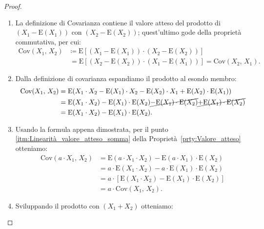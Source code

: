         \begin{proof}
            \hfill
            \begin{enumerate}
                \item La definizione di Covarianza contiene il valore atteso del prodotto di $(X_1-\text{E}(X_1))$ con $(X_2-\text{E}(X_2))$; quest'ultimo gode della proprietà commutativa, per cui:
                    \begin{align*}
                        \text{Cov}(X_1,\,X_2) &\coloneqq 
                        \text{E}\left[(X_1-\text{E}(X_1))\cdot(X_2-\text{E}(X_2))\right] \\
                        &\,= \text{E}\left[(X_2-\text{E}(X_2))\cdot(X_1-\text{E}(X_1))\right] =
                        \text{Cov}(X_2,\,X_1)
                    .\end{align*}
                \item Dalla definizione di covarianza espandiamo il prodotto al esondo membro:
                    \begin{align*}
                        \text{Cov}(X_1,\,X_2) &= \text{E}(X_1\cdot X_2 - \text{E}(X_1)\cdot X_2 -\text{E}(X_2)\cdot X_1 +\text{E}(X_2)\cdot \text{E}(X_1)) \\
                        &= \text{E}(X_1\cdot X_2) - \text{E}(X_1)\cdot \text{E}(X_2) \cancel{-\text{E}(X_1)\cdot \text{E}(X_2)} \cancel{+ \text{E}(X_1)\cdot \text{E}(X_2)} \\
                        &= \text{E}(X_1 \cdot X_2) - \text{E}(X_1)\cdot \text{E}(X_2)
                    .\end{align*}
                \item Usando la formula appena dimostrata, per il punto \eqref{itm:Linearità_valore_atteso_somma} della Proprietà~\ref{prty:Valore_atteso} otteniamo:
                    \begin{align*}
                        \text{Cov}(a\cdot X_1,\,X_2) &= \text{E}(a\cdot X_1 \cdot X_2) - \text{E}(a\cdot X_1)\cdot \text{E}(X_2) \\
                        &= a\cdot\text{E}(X_1 \cdot X_2) - a\cdot \text{E}(X_1) \cdot \text{E}(X_2) \\
                        &= a \cdot \left[\text{E}(X_1 \cdot X_2) - \text{E}(X_1) \cdot \text{E}(X_2)\right] \\
                        &= a \cdot \text{Cov}(X_1,\,X_2)
                    .\end{align*}
                \item Sviluppando il prodotto con $(X_1 + X_2)$ otteniamo:

\end{enumerate}
\end{proof}
